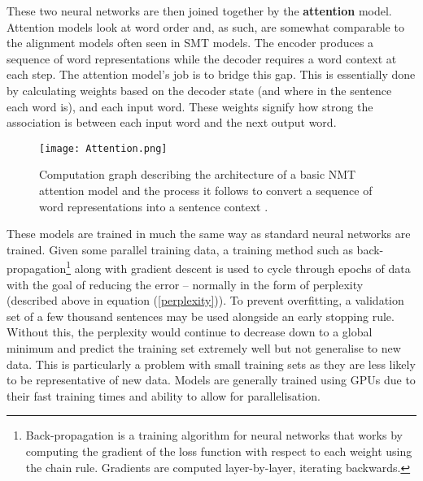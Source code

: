 \documentclass[11pt]{article}
\begin{document}
\bigskip

These two neural networks are then joined together by the \textbf{attention} model. Attention models look at word order and, as such, are somewhat comparable to the alignment models often seen in SMT models. The encoder produces a sequence of word representations while the decoder requires a word context at each step. The attention model’s job is to bridge this gap. This is essentially done by calculating weights based on the decoder state (and where in the sentence each word is), and each input word. These weights signify how strong the association is between each input word and the next output word.

\bigskip

\begin{figure}[h]
    \centering
    \texttt{[image: Attention.png]}
    \caption{Computation graph describing the architecture of a basic NMT attention model and the process it follows to convert a sequence of word representations into a sentence context \citep[p. 130]{koehn2020}.}
    \label{fig:attention}
\end{figure}

\bigskip

These models are trained in much the same way as standard neural networks are trained. Given some parallel training data, a training method such as back-propagation\footnote{Back-propagation is a training algorithm for neural networks that works by computing the gradient of the loss function with respect to each weight using the chain rule. Gradients are computed layer-by-layer, iterating backwards.} along with gradient descent is used to cycle through epochs of data with the goal of reducing the error -- normally in the form of perplexity (described above in equation (\ref{perplexity})). %
To prevent overfitting, a validation set of a few thousand sentences may be used alongside an early stopping rule. Without this, the perplexity would continue to decrease down to a global minimum and predict the training set extremely well but not generalise to new data. This is particularly a problem with small training sets as they are less likely to be representative of new data. Models are generally trained using GPUs due to their fast training times and ability to allow for parallelisation. 

\bigskip
\end{document}
